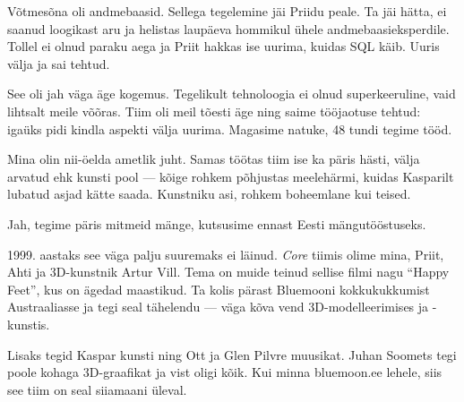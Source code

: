 
Võtmesõna oli andmebaasid. Sellega tegelemine jäi Priidu peale. Ta jäi hätta, ei saanud loogikast aru ja helistas laupäeva hommikul ühele andmebaasieksperdile. 
Tollel ei olnud paraku aega ja Priit hakkas ise uurima, kuidas 
SQL käib. Uuris välja ja sai tehtud.


See oli jah väga äge kogemus. Tegelikult tehnoloogia ei olnud superkeeruline, vaid lihtsalt meile võõras. Tiim oli meil tõesti äge 
ning saime tööjaotuse tehtud: igaüks pidi kindla aspekti välja uurima. 
Magasime natuke, 48 tundi tegime tööd.


Mina olin nii-öelda ametlik juht. Samas töötas tiim ise ka päris hästi, 
välja arvatud ehk kunsti pool --- kõige rohkem põhjustas
meelehärmi, kuidas Kasparilt lubatud asjad kätte 
saada. Kunstniku asi, rohkem boheemlane kui teised.


Jah, tegime päris mitmeid mänge, kutsusime ennast Eesti mängutööstuseks. 


1999. aastaks see väga palju suuremaks ei läinud. \emph{Core} tiimis olime 
mina, Priit, Ahti ja 3D-kunstnik Artur 
Vill. Tema on muide teinud 
sellise filmi nagu \enquote{Happy Feet}, kus on ägedad maastikud. Ta kolis 
pärast Bluemooni kokkukukkumist Austraaliasse ja tegi seal tähelendu --- väga 
kõva vend 3D-modelleerimises ja -kunstis.

Lisaks tegid Kaspar kunsti ning Ott ja Glen Pilvre muusikat. Juhan 
Soomets tegi poole kohaga 3D-graafikat ja 
vist oligi kõik. Kui minna bluemoon.ee lehele, siis see tiim on seal siiamaani 
üleval.

